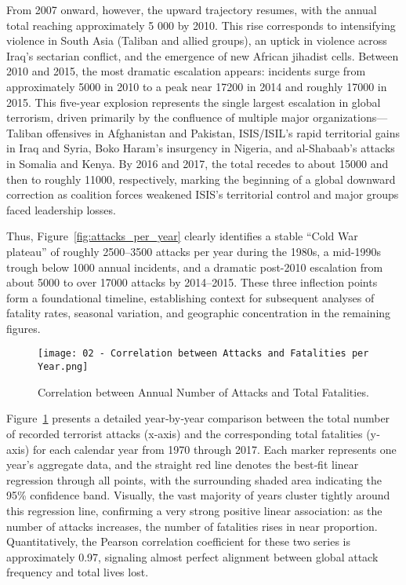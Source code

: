 From 2007 onward, however, the upward trajectory resumes, with the annual total reaching approximately 5 000 by 2010. This rise corresponds to intensifying violence in South Asia (Taliban and allied groups), an uptick in violence across Iraq’s sectarian conflict, and the emergence of new African jihadist cells. Between 2010 and 2015, the most dramatic escalation appears: incidents surge from approximately 5000 in 2010 to a peak near 17200 in 2014 and roughly 17000 in 2015. This five-year explosion represents the single largest escalation in global terrorism, driven primarily by the confluence of multiple major organizations—Taliban offensives in Afghanistan and Pakistan, ISIS/ISIL’s rapid territorial gains in Iraq and Syria, Boko Haram’s insurgency in Nigeria, and al-Shabaab’s attacks in Somalia and Kenya. By 2016 and 2017, the total recedes to about 15000 and then to roughly 11000, respectively, marking the beginning of a global downward correction as coalition forces weakened ISIS’s territorial control and major groups faced leadership losses.

Thus, Figure~\ref{fig:attacks_per_year} clearly identifies a stable “Cold War plateau” of roughly 2500–3500 attacks per year during the 1980s, a mid-1990s trough below 1000 annual incidents, and a dramatic post-2010 escalation from about 5000 to over 17000 attacks by 2014–2015. These three inflection points form a foundational timeline, establishing context for subsequent analyses of fatality rates, seasonal variation, and geographic concentration in the remaining figures.

\vspace{0.5em}
\begin{figure}[ht]
  \centering
  \texttt{[image: 02 - Correlation between Attacks and Fatalities per Year.png]}
  \caption{Correlation between Annual Number of Attacks and Total Fatalities.}
  \label{fig:corr_attacks_fatalities}
\end{figure}

Figure~\ref{fig:corr_attacks_fatalities} presents a detailed year‐by‐year comparison between the total number of recorded terrorist attacks (x‐axis) and the corresponding total fatalities (y‐axis) for each calendar year from 1970 through 2017. Each marker represents one year’s aggregate data, and the straight red line denotes the best‐fit linear regression through all points, with the surrounding shaded area indicating the 95\% confidence band. Visually, the vast majority of years cluster tightly around this regression line, confirming a very strong positive linear association: as the number of attacks increases, the number of fatalities rises in near proportion. Quantitatively, the Pearson correlation coefficient for these two series is approximately 0.97, signaling almost perfect alignment between global attack frequency and total lives lost.

